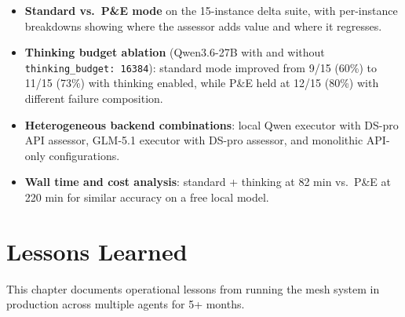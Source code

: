 \documentclass[11pt,letterpaper]{report}
\newcommand{\code}[1]{\texttt{#1}}
\begin{document}
\begin{itemize}[nosep]
  \item \textbf{Standard vs.\ P\&E mode} on the 15-instance delta
        suite, with per-instance breakdowns showing where the assessor
        adds value and where it regresses.
  \item \textbf{Thinking budget ablation} (Qwen3.6-27B with and without
        \code{thinking\_budget: 16384}): standard mode improved from
        9/15 (60\%) to 11/15 (73\%) with thinking enabled, while P\&E
        held at 12/15 (80\%) with different failure composition.
  \item \textbf{Heterogeneous backend combinations}: local Qwen executor
        with DS-pro API assessor, GLM-5.1 executor with DS-pro assessor,
        and monolithic API-only configurations.
  \item \textbf{Wall time and cost analysis}: standard + thinking at
        82 min vs.\ P\&E at 220 min for similar accuracy on a free local
        model.
\end{itemize}


\chapter{Lessons Learned}
\label{ch:lessons}

This chapter documents operational lessons from running the mesh
system in production across multiple agents for 5+ months.
\end{document}
